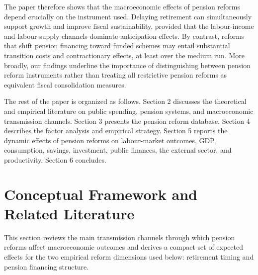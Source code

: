 \documentclass[11pt,english,a4paper, twoside, authoryear]{article}
\begin{document}
The paper therefore shows that the macroeconomic effects of pension reforms depend crucially on the instrument used. Delaying retirement can simultaneously support growth and improve fiscal sustainability, provided that the labour-income and labour-supply channels dominate anticipation effects. By contrast, reforms that shift pension financing toward funded schemes may entail substantial transition costs and contractionary effects, at least over the medium run. More broadly, our findings underline the importance of distinguishing between pension reform instruments rather than treating all restrictive pension reforms as equivalent fiscal consolidation measures.

The rest of the paper is organized as follows. Section 2 discusses the theoretical and empirical literature on public spending, pension systems, and macroeconomic transmission channels. Section 3 presents the pension reform database. Section 4 describes the factor analysis and empirical strategy. Section 5 reports the dynamic effects of pension reforms on labour-market outcomes, GDP, consumption, savings, investment, public finances, the external sector, and productivity. Section 6 concludes.


\section{Conceptual Framework and Related Literature}


This section reviews the main transmission channels through which pension reforms affect macroeconomic outcomes and derives a compact set of expected effects for the two empirical reform dimensions used below: retirement timing and pension financing structure.






\end{document}
